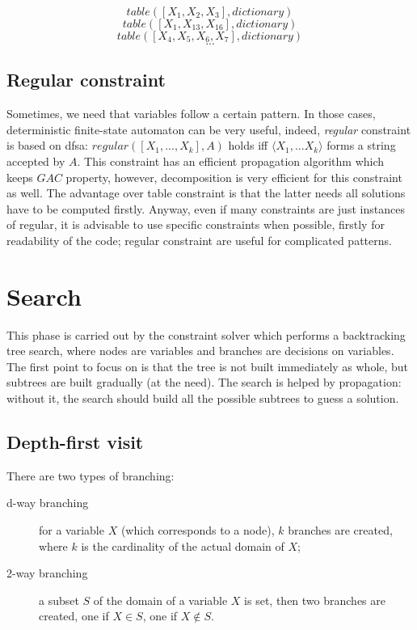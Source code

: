 \documentclass[10pt,a4paper]{article}
\begin{document}
\[ table([X_1, X_2, X_3], dictionary) \]
\[ table([X_1, X_{13}, X_{16}], dictionary) \]
\[ table([X_4, X_5, X_6, X_7], dictionary) \]
\[ ... \]

\subsection{Regular constraint}
Sometimes, we need that variables follow a certain pattern. In those cases,
deterministic finite-state automaton can be very useful, indeed,
\textit{regular} constraint is based on dfsa: $regular([X_1, ..., X_k], A)$
holds iff $\langle X_1, ... X_k \rangle$ forms a string accepted by $A$. This
constraint has an efficient propagation algorithm which keeps $GAC$ property,
however, decomposition is very efficient for this constraint as well. The
advantage over table constraint is that the latter needs all solutions have to
be computed firstly. Anyway, even if many constraints are just instances of
regular, it is advisable to use specific constraints when possible, firstly for
readability of the code; regular constraint are useful for complicated patterns.

\section{Search}
This phase is carried out by the constraint solver which performs a backtracking
tree search, where nodes are variables and branches are decisions on variables.
The first point to focus on is that the tree is not built immediately as whole,
but subtrees are built gradually (at the need). The search is helped by
propagation: without it, the search should build all the possible subtrees to
guess a solution.

\noindent{}

\subsection{Depth-first visit}
There are two types of branching:

\begin{description}
    \item[d-way branching] for a variable $X$ (which corresponds to a node), $k$
    branches are created, where $k$ is the cardinality of the actual domain of
    $X$;
    \item[2-way branching] a subset $S$ of the domain of a variable $X$ is set,
    then two branches are created, one if $X \in S$, one if $X \notin S$.
\end{description}
\end{document}
